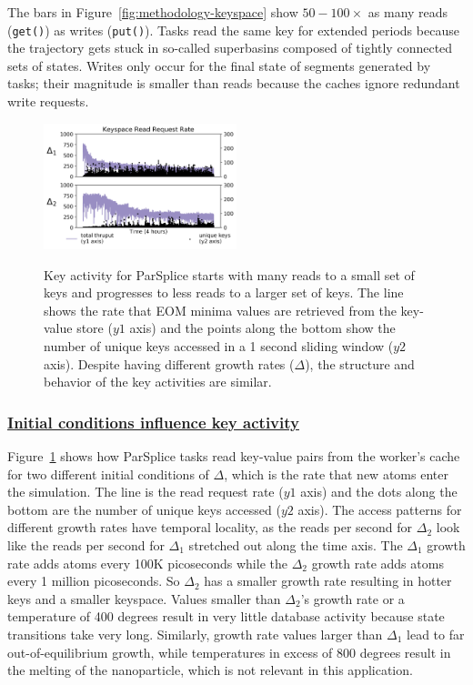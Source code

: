 The bars in Figure~\ref{fig:methodology-keyspace} show \(50-100\times\) as many
reads (\texttt{get()}) as writes (\texttt{put()}).  Tasks read the same key for
extended periods because the trajectory gets stuck in so-called superbasins
composed of tightly connected sets of states.  Writes only occur for the final
state of segments generated by tasks; their magnitude is smaller than reads
because the caches ignore redundant write requests. 

\begin{figure}[t]
  \noindent\includegraphics[width=0.5\textwidth]{figures/motivation-regimes.png}\\
  \caption{Key activity for ParSplice starts with many reads to a small set of
keys and progresses to less reads to a larger set of keys.  The line shows the
rate that EOM minima values are retrieved from the key-value store (\(y1\)
axis) and the points along the bottom show the number of unique keys accessed in a 1
second sliding window (\(y2\) axis). Despite having different growth rates
(\(\Delta\)), the structure and behavior of the key activities are similar.
\label{fig:motivation-regimes}}
\end{figure}

\subsubsection{\underline{Initial conditions influence key activity}}
\label{sec:delta}
Figure~\ref{fig:motivation-regimes} shows how ParSplice tasks read key-value
pairs from the worker's cache for two different initial conditions of
\(\Delta\), which is the rate that new atoms enter the simulation.  The line is
the read request rate (\(y1\) axis) and the dots along the bottom are the
number of unique keys accessed (\(y2\) axis).  The access patterns for
different growth rates have temporal locality, as the reads per second for
\(\Delta_2\) look like the reads per second for \(\Delta_1\) stretched out
along the time axis.  The \(\Delta_1\) growth rate adds atoms every 100K
picoseconds while the \(\Delta_2\) growth rate adds atoms every 1 million
picoseconds. So \(\Delta_2\) has a smaller growth rate resulting in hotter
keys and a smaller keyspace.  Values smaller than \(\Delta_2\)'s growth rate or
a temperature of 400 degrees result in very little database activity because
state transitions take very long. Similarly, growth rate values larger than \(\Delta_1\)
lead to far out-of-equilibrium growth, while temperatures in excess of 800 degrees
result in the melting of the nanoparticle, which is not relevant in this application.

